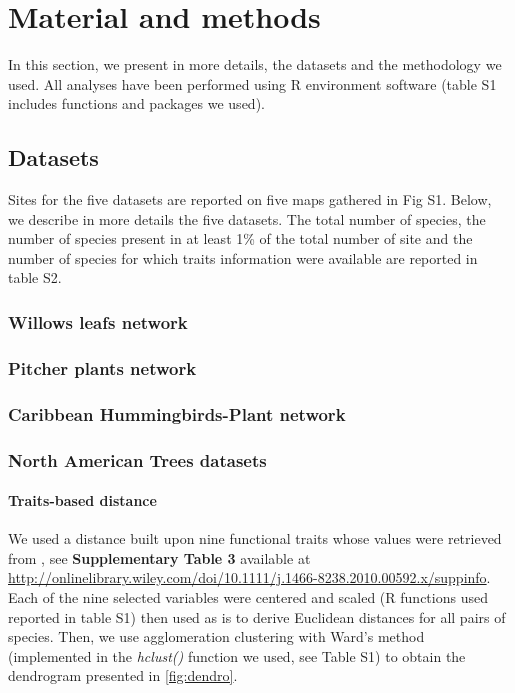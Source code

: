 \newpage
\section{Material and methods}\label{material-and-methods}

In this section, we present in more details, the datasets and the
methodology we used. All analyses have been performed using R
environment software (table S1 includes functions and packages we used).

\subsection{Datasets}\label{datasets}

Sites for the five datasets are reported on five maps gathered in Fig
S1. Below, we describe in more details the five datasets. The total
number of species, the number of species present in at least 1\% of the
total number of site and the number of species for which traits
information were available are reported in table S2.

\subsubsection{Willows leafs network}\label{willows-leafs-network}

\subsubsection{Pitcher plants network}\label{pitcher-plants-network}

\subsubsection{Caribbean Hummingbirds-Plant
network}\label{caribbean-hummingbirds-plant-network}

\subsubsection{North American Trees
datasets}\label{north-american-trees-datasets}

\paragraph{Traits-based distance}\label{traits-based-distance}

We used a distance built upon nine functional traits whose values were
retrieved from \citep{Paquette_2010}, see \textbf{Supplementary Table 3}
available at
\url{http://onlinelibrary.wiley.com/doi/10.1111/j.1466-8238.2010.00592.x/suppinfo}.
Each of the nine selected variables were centered and scaled (R
functions used reported in table S1) then used as is to derive Euclidean
distances for all pairs of species. Then, we use agglomeration
clustering with Ward's method (implemented in the \emph{hclust()}
function we used, see Table S1) to obtain the dendrogram presented in
\ref{fig:dendro}.

